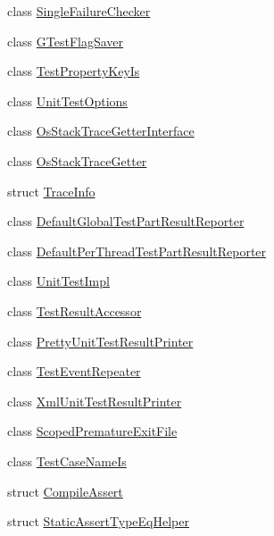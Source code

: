 \begin{DoxyCompactItemize}
\item 
class \hyperlink{classtesting_1_1internal_1_1_single_failure_checker}{Single\-Failure\-Checker}
\item 
class \hyperlink{classtesting_1_1internal_1_1_g_test_flag_saver}{G\-Test\-Flag\-Saver}
\item 
class \hyperlink{classtesting_1_1internal_1_1_test_property_key_is}{Test\-Property\-Key\-Is}
\item 
class \hyperlink{classtesting_1_1internal_1_1_unit_test_options}{Unit\-Test\-Options}
\item 
class \hyperlink{classtesting_1_1internal_1_1_os_stack_trace_getter_interface}{Os\-Stack\-Trace\-Getter\-Interface}
\item 
class \hyperlink{classtesting_1_1internal_1_1_os_stack_trace_getter}{Os\-Stack\-Trace\-Getter}
\item 
struct \hyperlink{structtesting_1_1internal_1_1_trace_info}{Trace\-Info}
\item 
class \hyperlink{classtesting_1_1internal_1_1_default_global_test_part_result_reporter}{Default\-Global\-Test\-Part\-Result\-Reporter}
\item 
class \hyperlink{classtesting_1_1internal_1_1_default_per_thread_test_part_result_reporter}{Default\-Per\-Thread\-Test\-Part\-Result\-Reporter}
\item 
class \hyperlink{classtesting_1_1internal_1_1_unit_test_impl}{Unit\-Test\-Impl}
\item 
class \hyperlink{classtesting_1_1internal_1_1_test_result_accessor}{Test\-Result\-Accessor}
\item 
class \hyperlink{classtesting_1_1internal_1_1_pretty_unit_test_result_printer}{Pretty\-Unit\-Test\-Result\-Printer}
\item 
class \hyperlink{classtesting_1_1internal_1_1_test_event_repeater}{Test\-Event\-Repeater}
\item 
class \hyperlink{classtesting_1_1internal_1_1_xml_unit_test_result_printer}{Xml\-Unit\-Test\-Result\-Printer}
\item 
class \hyperlink{classtesting_1_1internal_1_1_scoped_premature_exit_file}{Scoped\-Premature\-Exit\-File}
\item 
class \hyperlink{classtesting_1_1internal_1_1_test_case_name_is}{Test\-Case\-Name\-Is}
\item 
struct \hyperlink{structtesting_1_1internal_1_1_compile_assert}{Compile\-Assert}
\item 
struct \hyperlink{structtesting_1_1internal_1_1_static_assert_type_eq_helper}{Static\-Assert\-Type\-Eq\-Helper}

\end{DoxyCompactItemize}
